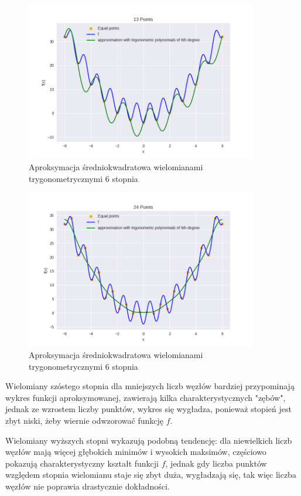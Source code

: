 \documentclass{article}
\begin{document}
\begin{figure}[H]
    \centering
    \includegraphics[width=0.9\textwidth]{img/tripoly_6_13.png}
    \caption{Aproksymacja średniokwadratowa wielomianami trygonometrycznymi 6 stopnia}
\end{figure}

\begin{figure}[H]
    \centering
    \includegraphics[width=0.9\textwidth]{img/tripoly_6_24.png}
    \caption{Aproksymacja średniokwadratowa wielomianami trygonometrycznymi 6 stopnia}
\end{figure}

Wielomiany szóstego stopnia dla mniejszych liczb węzłów bardziej przypominają wykres funkcji aproksymowanej, zawierają kilka
charakterystycznych "zębów", jednak ze wzrostem liczby punktów, wykres się wygładza, ponieważ stopień jest zbyt niski, żeby
wiernie odwzorować funkcję $f$.

Wielomiany wyższych stopni wykazują podobną tendencję: dla niewielkich liczb węzłów mają więcej głębokich minimów i wysokich maksimów,
częściowo pokazują charakterystyczny kształt funkcji $f$, jednak gdy liczba punktów względem stopnia wielomianu staje się zbyt duża,
wygładzają się, tak więc liczba węzłów nie poprawia drastycznie dokładności.
\end{document}
